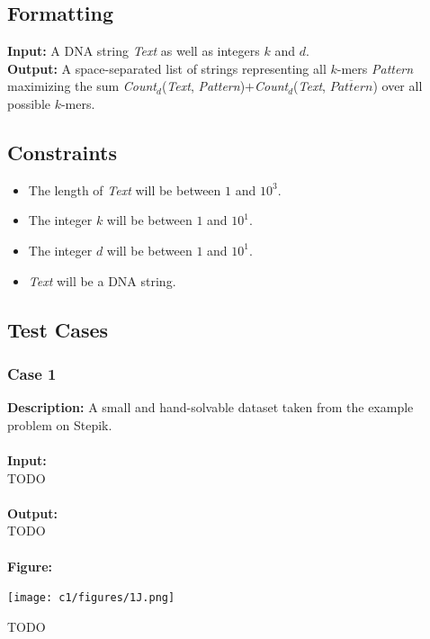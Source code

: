 \documentclass{article}
\newcommand{\code}[1]{{\fontfamily{pcr}\selectfont #1}}
\begin{document}
\subsection*{Formatting}
\textbf{Input:} A DNA string \emph{Text} as well as integers $k$ and $d$.\\
\noindent \textbf{Output:} A space-separated list of strings representing all $k$-mers \emph{Pattern} maximizing the sum \emph{Count}$_d$(\emph{Text}, \emph{Pattern})$+$\emph{Count}$_d$(\emph{Text}, $\overline{Pattern}$) over all possible $k$-mers.

\subsection*{Constraints}
\begin{itemize}
    \item The length of \emph{Text} will be between $1$ and $10^3$.
    \item The integer $k$ will be between $1$ and $10^1$.
    \item The integer $d$ will be between $1$ and $10^1$.
    \item \emph{Text} will be a DNA string.
\end{itemize}
\pagebreak

\subsection*{Test Cases}
\subsubsection*{Case 1}
\hline \vspace{5}
\textbf{Description:} A small and hand-solvable dataset taken from the example problem on Stepik.\\ \\
\noindent \textbf{Input:}\\
\code{
TODO
}\\ \\
\noindent \textbf{Output:}\\
\code{
TODO
}\\ \\
\noindent \textbf{Figure:}
\begin{center}
    \texttt{[image: c1/figures/1J.png]}
\end{center}
\noindent TODO
\pagebreak
\end{document}
